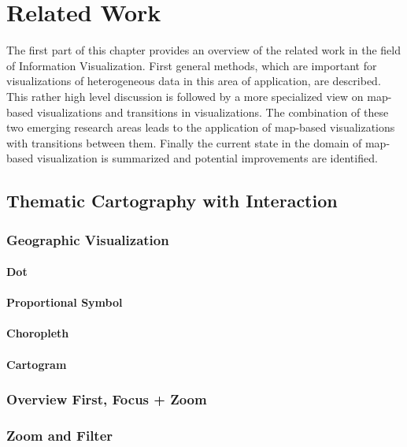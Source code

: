 \section{Related Work}
The first part of this chapter provides an overview of the related work in the field of
Information Visualization. First general methods, which are important for visualizations of heterogeneous data in this area of application, are described. This rather high level discussion is followed by a more specialized view on map-based visualizations and transitions in visualizations. The combination of these two emerging research areas leads to the application of map-based visualizations with transitions between them. Finally the current state in the domain of map-based visualization is summarized and potential improvements are identified.

\subsection{Thematic Cartography with Interaction}

\subsubsection{Geographic Visualization}

\paragraph{Dot}

\paragraph{Proportional Symbol}

\paragraph{Choropleth}

\paragraph{Cartogram}

\subsubsection{Overview First, Focus + Zoom}

\subsubsection{Zoom and Filter}

